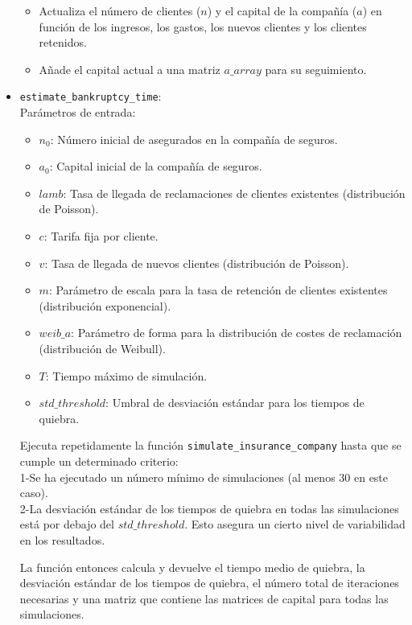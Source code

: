 \documentclass{article}
\begin{document}
\begin{itemize}
\begin{itemize}
            \item Actualiza el número de clientes ($n$) y el capital de la compañía ($a$) en función de los ingresos, los gastos, los nuevos clientes y los clientes retenidos.
            \item Añade el capital actual a una matriz $a\_array$ para su seguimiento.
        \end{itemize}
    \item \texttt{estimate\_bankruptcy\_time}: \\
    Parámetros de entrada:
    \begin{itemize}
        \item $n_0$: Número inicial de asegurados en la compañía de seguros.
            \item $a_0$: Capital inicial de la compañía de seguros.
            \item $lamb$: Tasa de llegada de reclamaciones de clientes existentes (distribución de Poisson).
            \item $c$: Tarifa fija por cliente. 
            \item $v$: Tasa de llegada de nuevos clientes (distribución de Poisson).
            \item $m$: Parámetro de escala para la tasa de retención de clientes existentes (distribución exponencial).
            \item $weib\_a$: Parámetro de forma para la distribución de costes de reclamación (distribución de Weibull).
            \item $T$: Tiempo máximo de simulación.
            \item $std\_threshold$: Umbral de desviación estándar para los tiempos de quiebra.
    \end{itemize}
    Ejecuta repetidamente la función \texttt{simulate\_insurance\_company} hasta que se cumple un determinado criterio:\\

    1-Se ha ejecutado un número mínimo de simulaciones (al menos 30 en este caso).\\
    2-La desviación estándar de los tiempos de quiebra en todas las simulaciones está por debajo del $std\_threshold$. Esto asegura un cierto nivel de variabilidad en los resultados.

    La función entonces calcula y devuelve el tiempo medio de quiebra, la desviación estándar de los tiempos de quiebra, el número total de iteraciones necesarias y una matriz que contiene las matrices de capital para todas las simulaciones.


\end{itemize}
\end{document}
